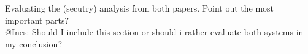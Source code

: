 Evaluating the (secutry) analysis from both papers. Point out the most important parts?\\

@Ines: Should I include this section or should i rather evaluate both systems in my conclusion?
